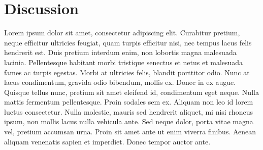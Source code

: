 \section{Discussion}
Lorem ipsum dolor sit amet, consectetur adipiscing elit. Curabitur pretium, neque efficitur ultricies feugiat, quam turpis efficitur nisi, nec tempus lacus felis hendrerit est. Duis pretium interdum enim, non lobortis magna malesuada lacinia. Pellentesque habitant morbi tristique senectus et netus et malesuada fames ac turpis egestas. Morbi at ultricies felis, blandit porttitor odio. Nunc at lacus condimentum, gravida odio bibendum, mollis ex. Donec in ex augue. Quisque tellus nunc, pretium sit amet eleifend id, condimentum eget neque. Nulla mattis fermentum pellentesque. Proin sodales sem ex. Aliquam non leo id lorem luctus consectetur. Nulla molestie, mauris sed hendrerit aliquet, mi nisi rhoncus ipsum, non mollis lacus nulla vehicula ante. Sed neque dolor, porta vitae magna vel, pretium accumsan urna. Proin sit amet ante ut enim viverra finibus. Aenean aliquam venenatis sapien et imperdiet. Donec tempor auctor ante.